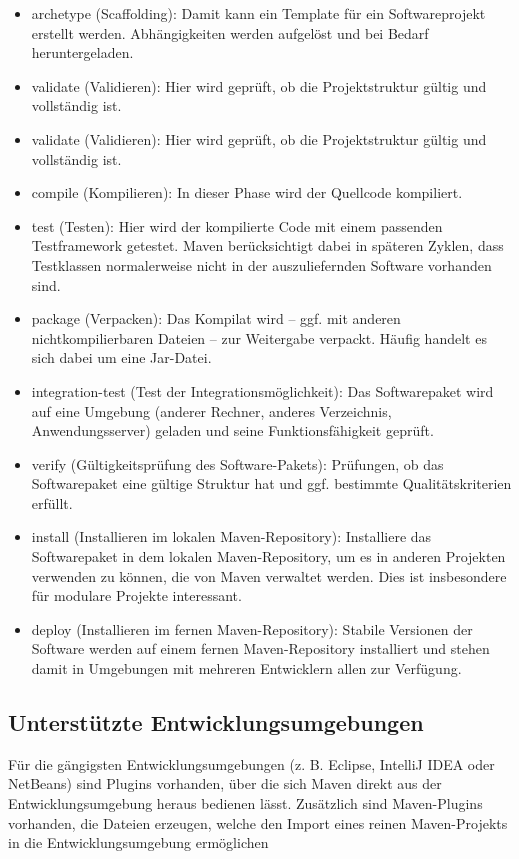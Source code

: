 \documentclass{article}
\begin{document}
\begin{itemize}
\item archetype (Scaffolding): Damit kann ein Template für ein Softwareprojekt erstellt werden. Abhängigkeiten werden aufgelöst und bei Bedarf heruntergeladen.
\item validate (Validieren): Hier wird geprüft, ob die Projektstruktur gültig und vollständig ist.
\item validate (Validieren): Hier wird geprüft, ob die Projektstruktur gültig und vollständig ist.
\item compile (Kompilieren): In dieser Phase wird der Quellcode kompiliert.
\item test (Testen): Hier wird der kompilierte Code mit einem passenden Testframework getestet. Maven berücksichtigt dabei in späteren Zyklen, dass Testklassen normalerweise nicht in der auszuliefernden Software vorhanden sind.
\item package (Verpacken): Das Kompilat wird – ggf. mit anderen nichtkompilierbaren Dateien – zur Weitergabe verpackt. Häufig handelt es sich dabei um eine Jar-Datei.
\item integration-test (Test der Integrationsmöglichkeit): Das Softwarepaket wird auf eine Umgebung (anderer Rechner, anderes Verzeichnis, Anwendungsserver) geladen und seine Funktionsfähigkeit geprüft.
\item verify (Gültigkeitsprüfung des Software-Pakets): Prüfungen, ob das Softwarepaket eine gültige Struktur hat und ggf. bestimmte Qualitätskriterien erfüllt.
\item install (Installieren im lokalen Maven-Repository): Installiere das Softwarepaket in dem lokalen Maven-Repository, um es in anderen Projekten verwenden zu können, die von Maven verwaltet werden. Dies ist insbesondere für modulare Projekte interessant.
\item deploy (Installieren im fernen Maven-Repository): Stabile Versionen der Software werden auf einem fernen Maven-Repository installiert und stehen damit in Umgebungen mit mehreren Entwicklern allen zur Verfügung.
\end{itemize}


\subsection{Unterstützte Entwicklungsumgebungen}
Für die gängigsten Entwicklungsumgebungen (z. B. Eclipse, IntelliJ IDEA oder NetBeans) sind Plugins vorhanden, über die sich Maven direkt aus der Entwicklungsumgebung heraus bedienen lässt. Zusätzlich sind Maven-Plugins vorhanden, die Dateien erzeugen, welche den Import eines reinen Maven-Projekts in die Entwicklungsumgebung ermöglichen 
\end{document}
